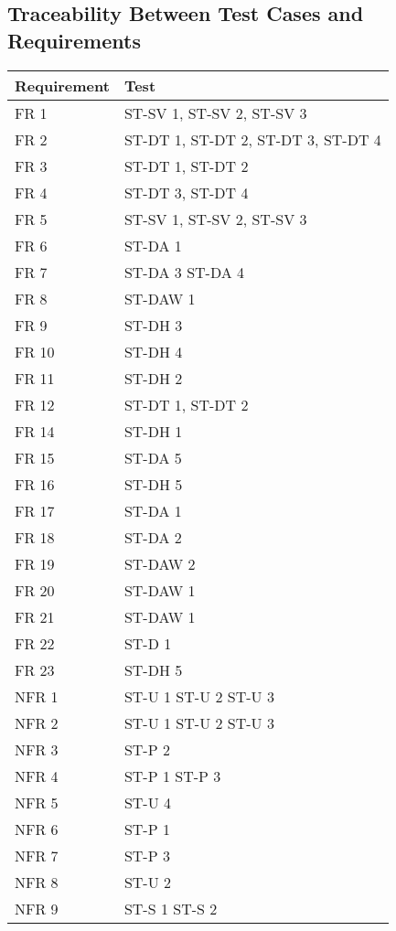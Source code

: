 \documentclass[12pt, titlepage]{article}
\begin{document}
\subsection{Traceability Between Test Cases and Requirements}
\begin{tabular}{| p{} | p{}|}
  \hline
  \rowcolor[gray]{0.9}
  Requirement & Test \\
  \hline
  FR 1 & ST-SV 1, ST-SV 2, ST-SV 3 \\
  \hline
  FR 2 & ST-DT 1, ST-DT 2, ST-DT 3, ST-DT 4 \\
  \hline
  FR 3 & ST-DT 1, ST-DT 2 \\
  \hline
  FR 4 & ST-DT 3, ST-DT 4 \\
  \hline
  FR 5 & ST-SV 1, ST-SV 2, ST-SV 3 \\
  \hline
  FR 6 & ST-DA 1 \\
  \hline
  FR 7 & ST-DA 3 ST-DA 4 \\
  \hline
  FR 8 & ST-DAW 1 \\
  \hline
  FR 9 & ST-DH 3 \\
  \hline
  FR 10 & ST-DH 4 \\
  \hline
  FR 11 & ST-DH 2 \\
  \hline
  FR 12 & ST-DT 1, ST-DT 2 \\
  \hline
  FR 14 & ST-DH 1 \\
  \hline
  FR 15 & ST-DA 5\\
  \hline
  FR 16 & ST-DH 5 \\
  \hline
  FR 17 & ST-DA 1 \\
  \hline
  FR 18 & ST-DA 2 \\
  \hline
  FR 19 & ST-DAW 2 \\
  \hline
  FR 20 & ST-DAW 1 \\
  \hline
  FR 21 & ST-DAW 1 \\
  \hline
  FR 22 & ST-D 1 \\
  \hline
  FR 23 & ST-DH 5 \\
  \hline
  NFR 1 & ST-U 1 ST-U 2 ST-U 3 \\
  \hline
  NFR 2 & ST-U 1 ST-U 2 ST-U 3 \\
  \hline
  NFR 3 & ST-P 2 \\
  \hline
  NFR 4 & ST-P 1 ST-P 3 \\
  \hline
  NFR 5 & ST-U 4 \\
  \hline
  NFR 6 & ST-P 1 \\
  \hline
  NFR 7 & ST-P 3 \\
  \hline
  NFR 8 & ST-U 2 \\
  \hline
  NFR 9 & ST-S 1 ST-S 2 \\
  \hline
\end{tabular}
\end{document}
